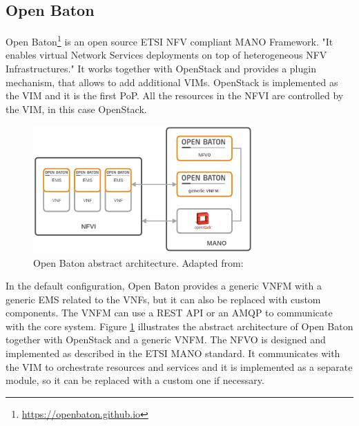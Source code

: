 \subsection{Open Baton}
Open Baton\footnote{\url{https://openbaton.github.io}} is an open source \ac{ETSI} \ac{NFV} compliant \ac{MANO} Framework\autocite[cf.]{openBatonDoc}.
"It enables virtual Network Services deployments on top of heterogeneous \ac{NFV} Infrastructures."\autocite{openBatonDoc}
It works together with OpenStack and provides a plugin mechanism, that allows to add additional \acp{VIM}.\autocite[cf.]{openBatonDoc}
OpenStack is implemented as the \ac{VIM} and it is the first \ac{PoP}.\autocite[cf.]{openBatonDoc}
All the resources in the \ac{NFVI} are controlled by the \ac{VIM}, in this case OpenStack.

\begin{figure}[H]
    \centering
    \includegraphics[width=0.75\textwidth]{resources/images/open_baton_simple_architecture.png}
    \caption[Open Baton abstract architecture]{Open Baton abstract architecture. Adapted from: \autocite{openBatonDoc}}
    \label{fig:open_baton_abstract_architecture}
\end{figure}

In the default configuration, Open Baton provides a generic \ac{VNFM} with a generic \ac{EMS} related to the \acp{VNF}, but it can also be replaced with custom components.
The \ac{VNFM} can use a \ac{REST} \ac{API} or an \ac{AMQP} to communicate with the core system.
Figure \ref{fig:open_baton_abstract_architecture} illustrates the abstract architecture of Open Baton together with OpenStack and a generic \ac{VNFM}.
The \ac{NFVO} is designed and implemented as described in the \ac{ETSI} \ac{MANO} standard.\autocite[cf.]{openBatonDoc}
It communicates with the \ac{VIM} to orchestrate resources and services and it is implemented as a separate module, so it can be replaced with a custom one if necessary.

